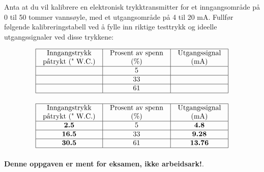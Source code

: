 
Anta at du vil kalibrere en elektronisk trykktransmitter for et inngangsområde på 0 til 50 tommer vannsøyle, med et utgangsområde på 4 til 20 mA. Fullfør følgende kalibreringstabell ved å fylle inn riktige testtrykk og ideelle utgangssignaler ved disse trykkene:


$$\vbox{\offinterlineskip
\halign{\strut
\vrule \quad\hfil # \ \hfil &
\vrule \quad\hfil # \ \hfil &
\vrule \quad\hfil # \ \hfil \vrule \cr
\noalign{\hrule}
%
Inngangstrykk & Prosent av spenn & Utgangssignal \cr
%
påtrykt (" W.C.) & (\%) & (mA) \cr
%
\noalign{\hrule}
%
 & 5 &  \cr
%
\noalign{\hrule}
%
 & 33 &  \cr
%
\noalign{\hrule}
%
 & 61 &  \cr
%
\noalign{\hrule}
} %
}$$ %









$$\vbox{\offinterlineskip
\halign{\strut
\vrule \quad\hfil # \ \hfil &
\vrule \quad\hfil # \ \hfil &
\vrule \quad\hfil # \ \hfil \vrule \cr
\noalign{\hrule}
%
Inngangstrykk & Prosent av spenn & Utgangssignal \cr
%
påtrykt (" W.C.) & (\%) & (mA) \cr
%
\noalign{\hrule}
%
{\bf 2.5} & 5 & {\bf 4.8} \cr
%
\noalign{\hrule}
%
{\bf 16.5} & 33 & {\bf 9.28} \cr
%
\noalign{\hrule}
%
{\bf 30.5} & 61 & {\bf 13.76} \cr
%
\noalign{\hrule}
} %
}$$ %







{\bf Denne oppgaven er ment for eksamen, ikke arbeidsark!}.

